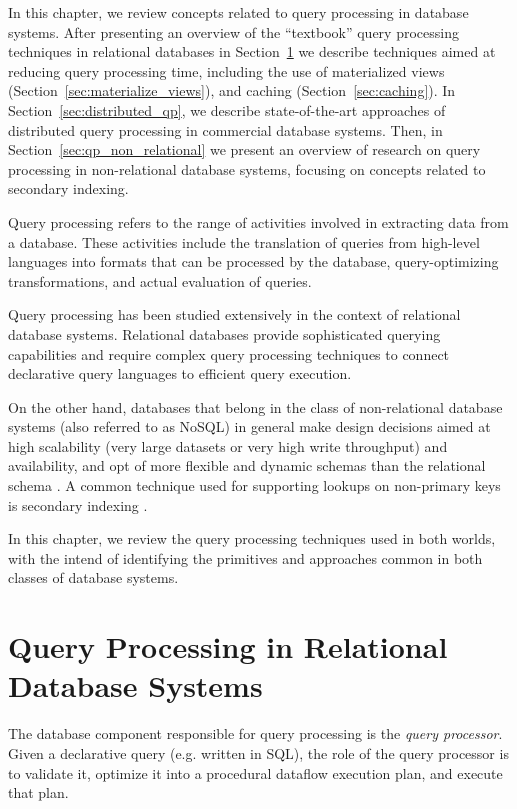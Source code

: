 In this chapter, we review concepts related to query processing in database systems.
After presenting an overview of the ``textbook'' query processing techniques in relational databases in Section~\ref{sec:query_pr_relational}
we describe techniques aimed at reducing query processing time, including the use of materialized views (Section~\ref{sec:materialize_views}),
and caching (Section~\ref{sec:caching}).
In Section~\ref{sec:distributed_qp}, we describe state-of-the-art approaches of distributed query processing in commercial database systems.
Then, in Section~\ref{sec:qp_non_relational} we present an overview of research on query processing in non-relational database systems,
focusing on concepts related to secondary indexing.

Query processing refers to the range of activities involved in extracting data from a database.
These activities include the translation of queries from high-level languages into formats that can be processed
by the database, query-optimizing transformations, and actual evaluation of queries.

Query processing has been studied extensively in the context of relational database systems.
Relational databases provide sophisticated querying capabilities and require complex query processing techniques
to connect declarative query languages to efficient query execution.

On the other hand, databases that belong in the class of non-relational database systems (also referred to as NoSQL)
in general make design decisions aimed at high scalability (very large datasets or very high write throughput) and availability,
and opt of more flexible and dynamic schemas than the relational schema \cite{couchbase:nosqladoption}.
A common technique used for supporting lookups on non-primary keys is secondary indexing \cite{riakv:secondaryindexes, cassandra:secondaryindexing}.

In this chapter, we review the query processing techniques used in both worlds,
with the intend of identifying the primitives and approaches common in both classes of database systems.

\section{Query Processing in Relational Database Systems}
\label{sec:query_pr_relational}
The database component responsible for query processing is the \textit{query processor}.
Given a declarative query (e.g. written in SQL), the role of the query processor is to validate it,
optimize it into a procedural dataflow execution plan, and execute that plan.

